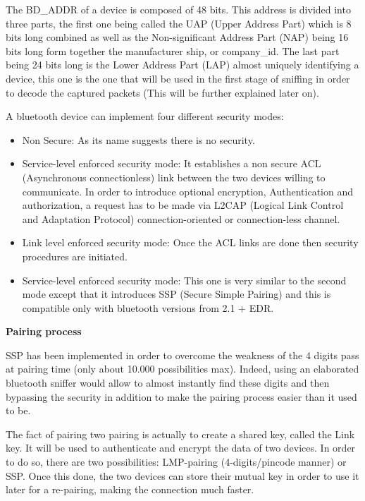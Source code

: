 The BD\_ADDR of a device is composed of 48 bits. This address is divided into three parts, the first one being called the UAP (Upper Address Part) which is 8 bits long combined as well as the Non-significant Address Part (NAP) being 16 bits long form together the manufacturer ship, or company\_id. The last part being 24 bits long is the Lower Address Part (LAP) almost uniquely identifying a device, this one is the one that will be used in the first stage of sniffing in order to decode the captured packets (This will be further explained later on). 

A bluetooth device can implement four different security modes:
  \begin{itemize}
  	\item Non Secure: As its name suggests there is no security.
  	\item Service-level enforced security mode: It establishes a non secure ACL (Asynchronous connectionless) 	link between the two devices willing to communicate. In order to introduce optional encryption, Authentication and authorization, a request has to be made via L2CAP (Logical Link Control and Adaptation Protocol) connection-oriented or connection-less channel.
  	\item Link level enforced security mode: Once the ACL links are done then security procedures are initiated.
  	\item Service-level enforced security mode: This one is very similar to the second mode except that it introduces SSP (Secure Simple Pairing) and this is compatible only with bluetooth versions from 2.1 + EDR.
  \end{itemize}
  

\textbf{Pairing process}

SSP has been implemented in order to overcome the weakness of the 4 digits pass at pairing time (only about 10.000 possibilities max). Indeed, using an elaborated bluetooth sniffer would allow to almost instantly find these digits and then bypassing the security in addition to make the pairing process easier than it used to be.
	
The fact of pairing two pairing is actually to create a shared key, called the Link key. It will be used to authenticate and encrypt the data of two devices.
In order to do so, there are two possibilities: LMP-pairing (4-digits/pincode manner) or SSP.
Once this done, the two devices can store their mutual key in order to use it later for a re-pairing, making the connection much faster.

